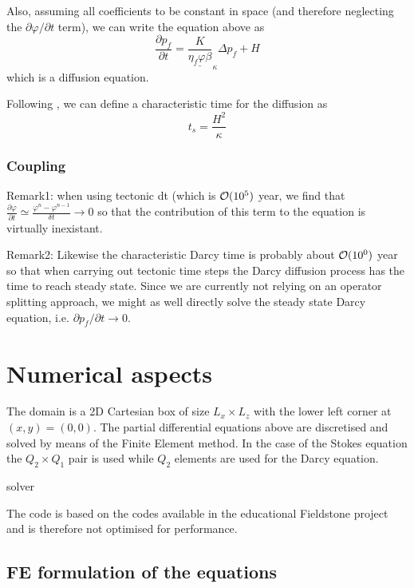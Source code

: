 \documentclass[a4paper]{article}
\begin{document}
Also, assuming all coefficients to be constant in space (and 
therefore neglecting the $\partial\varphi/\partial t$ term), we can write the 
equation above as
\[
\frac{\partial p_f}{\partial t}
= \underline{\frac{K}{\eta_f \varphi \beta}}_{\kappa}  \Delta  p_f  + H
\]
which is a diffusion equation.

Following \textcite{wanu84}, we can define a characteristic time for the diffusion
as 
\[
t_s = \frac{H^2}{\kappa}
\]



\subsubsection{Coupling}

Remark1: 
when using tectonic dt (which is ${\cal{O}}(10^5)$ year, 
we find that $\frac{\partial \varphi}{\partial t}
\simeq \frac{\varphi^n -\varphi^{n-1}}{\delta t } \rightarrow 0$
so that the contribution of this term to the equation is 
virtually inexistant.

Remark2: Likewise the characteristic Darcy time is probably 
about ${\cal{O}}(10^0)$ year so that when carrying out 
tectonic time steps the Darcy diffusion process has the time 
to reach steady state. Since we are currently not
relying on an operator splitting approach, we might as well
directly solve the steady state Darcy equation, i.e.
$\partial p_f/\partial t \rightarrow 0$. 




\newpage
\section{Numerical aspects}

The domain is a 2D Cartesian box of size $L_x \times L_z$
with the lower left corner at $(x,y)=(0,0)$.
The partial differential equations above are discretised and
solved by means of the Finite Element method.
In the case of the Stokes equation the $Q_2\times Q_1$ 
pair is used \textcite{thba22} while $Q_2$
elements are used for the Darcy equation.


solver

The code is based on the codes available in the educational Fieldstone project
and is therefore not optimised for performance.

\subsection{FE formulation of the equations}
\end{document}
